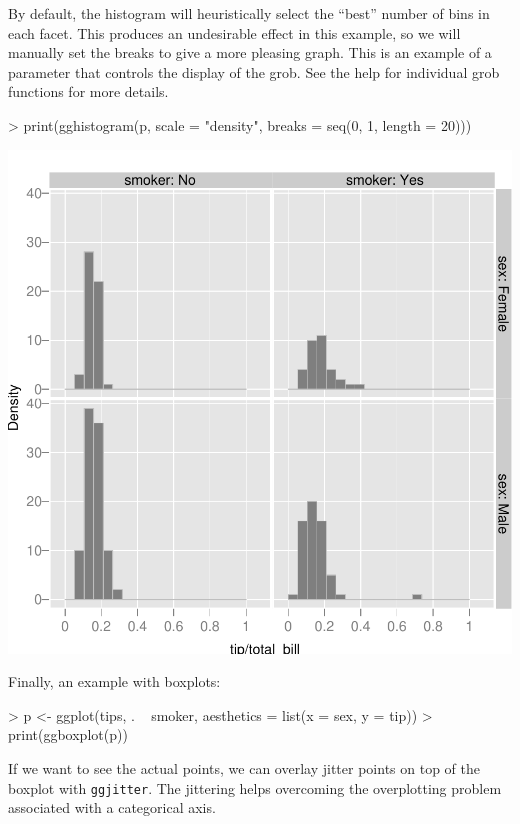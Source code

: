 \documentclass[]{article}
\begin{document}
By default, the histogram will heuristically select the ``best'' number of bins in each facet.  This produces an undesirable effect in this example, so we will manually set the breaks to give a more pleasing graph.  This is an example of a parameter that controls the display of the grob.  See the help for individual grob functions for more details.

\begin{Schunk}
\begin{Sinput}
> print(gghistogram(p, scale = "density", breaks = seq(0, 1, length = 20)))
\end{Sinput}
\end{Schunk}
\includegraphics{introduction-012}

Finally, an example with boxplots:

\begin{Schunk}
\begin{Sinput}
> p <- ggplot(tips, . ~ smoker, aesthetics = list(x = sex, y = tip))
> print(ggboxplot(p))
\end{Sinput}
\end{Schunk}

If we want to see the actual points, we can overlay jitter points on top of the boxplot with \texttt{ggjitter}.  The jittering helps overcoming the overplotting problem associated with a categorical axis.
\end{document}
